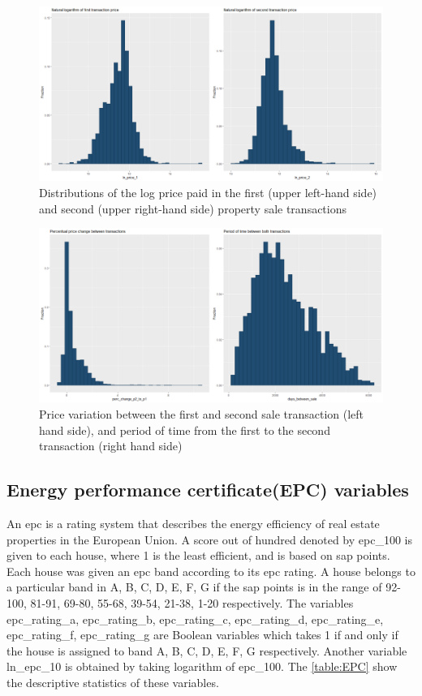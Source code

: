 \documentclass[12pt]{article}
\begin{document}
\begin{figure}[H]
    \centering
    \includegraphics[width=15cm]{ln_price.png}
    \caption{Distributions of the log price paid in the first (upper left-hand side) and second (upper right-hand side) property sale transactions}
    \label{fig:transactional1}
\end{figure}

\begin{figure}[H]
    \centering
    \includegraphics[width=17cm]{time_change.png}
    \caption{Price variation between the first and second sale transaction (left hand side), and period of time from the first to the second transaction (right hand side)}
    \label{fig:transactional2}
\end{figure}

\subsection{Energy performance certificate(EPC) variables}
An \acrshort{epc} is a rating system that describes the energy efficiency of real estate properties in the European Union. A score out of hundred denoted by epc\_100 is given to each house, where 1 is the least efficient, and is based on \acrfull{sap} points. Each house was given an \acrshort{epc} band according to its \acrshort{epc} rating. A house belongs to a particular band in A, B, C, D, E, F, G if the \acrshort{sap} points is in the range of 92-100, 81-91, 69-80, 55-68, 39-54, 21-38, 1-20 respectively. The variables epc\_rating\_a, epc\_rating\_b, epc\_rating\_c, epc\_rating\_d, epc\_rating\_e, epc\_rating\_f, epc\_rating\_g are Boolean variables which takes 1 if and only if the house is assigned to band A, B, C, D, E, F, G respectively. Another variable ln\_epc\_10 is obtained by taking logarithm of epc\_100. The \autoref{table:EPC} show the descriptive statistics of these variables. 
\end{document}
